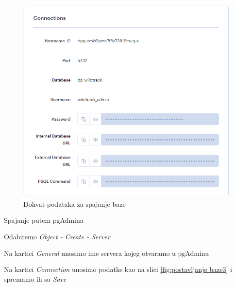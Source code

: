 \begin{packed_enum}
			\begin{figure}[H]
				\includegraphics[scale=1]{slike/postavljanje baze2.png}
				\centering
				\caption{Dohvat podataka za spajanje baze}
				\label{fig:postavljanje baze2}
			\end{figure}

			\item Spajanje putem pgAdmina
			\begin{packed_item}
				\item Odabiremo \textit{Object - Create - Server}
				\item Na kartici \textit{General} unosimo ime servera kojeg otvaramo u pgAdminu
				\item Na kartici \textit{Connection} unosimo podatke kao na slici \ref{fig:postavljanje baze3} i spremamo ih sa \textit{Save}
			\end{packed_item}


\end{packed_enum}
